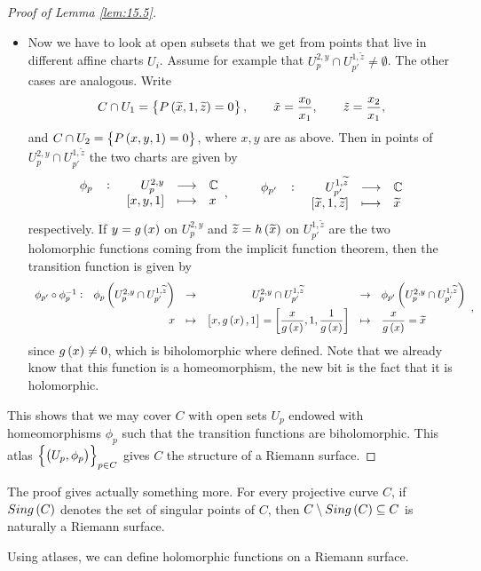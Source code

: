 \begin{proof}[Proof of Lemma \ref{lem:15.5}]
\begin{itemize}
\item Now we have to look at open subsets that we get from points that live in different affine charts $ U_i $. Assume for example that $ U_p^{2, y} \cap U_{p'}^{1, \widetilde{z}} \ne \emptyset $. The other cases are analogous. Write
$$ C \cap U_1 = \cbr{P\br{\widetilde{x}, 1, \widetilde{z}} = 0}, \qquad \tilde{x} = \dfrac{x_0}{x_1}, \qquad \tilde{z} = \dfrac{x_2}{x_1}, $$
and $ C \cap U_2 = \cbr{P\br{x, y, 1} = 0} $, where $ x, y $ are as above. Then in points of $ U_p^{2, y} \cap U_{p'}^{1, \widetilde{z}} $ the two charts are given by
$$ \function[\phi_p]{U_p^{2, y}}{\C}{\sbr{x, y, 1}}{x}, \qquad \function[\phi_{p'}]{U_{p'}^{1, \widetilde{z}}}{\C}{\sbr{\widetilde{x}, 1, \widetilde{z}}}{\widetilde{x}} $$
respectively. If $ y = g\br{x} $ on $ U_p^{2, y} $ and $ \widetilde{z} = h\br{\widetilde{x}} $ on $ U_{p'}^{1, \widetilde{z}} $ are the two holomorphic functions coming from the implicit function theorem, then the transition function is given by
$$
\begin{array}{crcccl}
\phi_{p'} \circ \phi_p^{-1} : & \phi_p\br{U_p^{2, y} \cap U_{p'}^{1, \widetilde{z}}} & \to & U_p^{2, y} \cap U_{p'}^{1, \widetilde{z}} & \to & \phi_{p'}\br{U_p^{2, y} \cap U_{p'}^{1, \widetilde{z}}} \\
& x & \mapsto & \sbr{x, g\br{x}, 1} = \sbr{\dfrac{x}{g\br{x}}, 1, \dfrac{1}{g\br{x}}} & \mapsto & \dfrac{x}{g\br{x}} = \widetilde{x}
\end{array},
$$
since $ g\br{x} \ne 0 $, which is biholomorphic where defined. Note that we already know that this function is a homeomorphism, the new bit is the fact that it is holomorphic.
\end{itemize}
This shows that we may cover $ C $ with open sets $ U_p $ endowed with homeomorphisms $ \phi_p $ such that the transition functions are biholomorphic. This atlas $ \cbr{\br{U_p, \phi_p}}_{p \in C} $ gives $ C $ the structure of a Riemann surface.
\end{proof}


\begin{remark}
The proof gives actually something more. For every projective curve $ C $, if $ Sing\br{C} $ denotes the set of singular points of $ C $, then $ C \setminus Sing\br{C} \subseteq C $ is naturally a Riemann surface.
\end{remark}

\pagebreak

Using atlases, we can define holomorphic functions on a Riemann surface.

